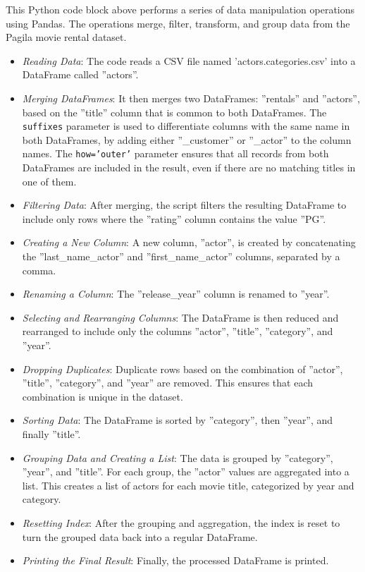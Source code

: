 This Python code block above performs a series of data manipulation operations using Pandas. The operations merge, filter, transform, and group data from the Pagila movie rental dataset.

\begin{itemize}
\item \emph{Reading Data}: The code reads a CSV file named 'actors.categories.csv' into a DataFrame called ''actors''.
\item \emph{Merging DataFrames}: It then merges two DataFrames: ''rentals'' and ''actors'', based on the ''title'' column that is common to both DataFrames. The \texttt{suffixes} parameter is used to differentiate columns with the same name in both DataFrames, by adding either ''\_customer'' or ''\_actor'' to the column names. The \texttt{how='outer'} parameter ensures that all records from both DataFrames are included in the result, even if there are no matching titles in one of them.
\item \emph{Filtering Data}: After merging, the script filters the resulting DataFrame to include only rows where the ''rating'' column contains the value ''PG''.
\item \emph{Creating a New Column}: A new column, ''actor'', is created by concatenating the ''last\_name\_actor'' and ''first\_name\_actor'' columns, separated by a comma.
\item \emph{Renaming a Column}: The ''release\_year'' column is renamed to ''year''.
\item \emph{Selecting and Rearranging Columns}: The DataFrame is then reduced and rearranged to include only the columns ''actor'', ''title'', ''category'', and ''year''.
\item \emph{Dropping Duplicates}: Duplicate rows based on the combination of ''actor'', ''title'', ''category'', and ''year'' are removed. This ensures that each combination is unique in the dataset.
\item \emph{Sorting Data}: The DataFrame is sorted by ''category'', then ''year'', and finally ''title''.
\item \emph{Grouping Data and Creating a List}: The data is grouped by ''category'', ''year'', and ''title''. For each group, the ''actor'' values are aggregated into a list. This creates a list of actors for each movie title, categorized by year and category.
\item \emph{Resetting Index}: After the grouping and aggregation, the index is reset to turn the grouped data back into a regular DataFrame.
\item \emph{Printing the Final Result}: Finally, the processed DataFrame is printed.
\end{itemize}


